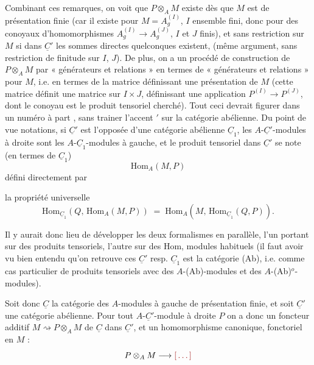 \documentclass[11pt,a4paper]{article}
\begin{document}
Combinant ces remarques, on voit que $P \otimes_A M$ existe  dès que $M$ est de présentation finie (car il existe pour $M = A_g^{(I)}$, $I$ ensemble fini, donc pour des conoyaux d'homomorphismes $A_g^{(I)} \to A_g^{(J)}$, $I$ et $J$ finis), et sans restriction sur $M$ si dans $\underline{C}'$ les sommes directes quelconques existent, (même argument, sans restriction de finitude sur $I$, $J$). De plus, on a un procédé de construction de $P \otimes_A M$ par « générateurs et relations » en termes de « générateurs et relations » pour $M$, i.e. en termes  de la matrice définissant une présentation  de $M$ (cette matrice définit une matrice sur $I \times J$, définissant une application $P^{(I)} \to P^{(J)}$, dont le conoyau est le produit tensoriel cherché). Tout ceci devrait figurer dans un numéro à part , sans trainer l'accent $'$ sur la catégorie abélienne. Du point de vue notations, si $\underline{C}'$ est  l'opposée  d'une catégorie abélienne $\underline{C}_1$,  les $A$-$\underline{C}'$-modules à droite sont les $A$-$\underline{C}_1$-modules à gauche, et le produit tensoriel dans $\underline{C}'$ se note (en termes de $\underline{C}_1$)
\[
  \mathrm{Hom}_A(M,P)
\]
défini directement par 

la propriété universelle
\[
  \mathrm{Hom}_{\underline{C}_1}(Q,\, \mathrm{Hom}_A(M,P)) \;=\; \mathrm{Hom}_A(M,\, \mathrm{Hom}_{\underline{C}_1}(Q,P)) .
\]

Il y aurait donc lieu de développer les deux formalismes en parallèle, l'un portant sur des produits tensoriels, l'autre sur des Hom,  modules habituels (il faut avoir vu bien entendu qu'on retrouve ces    $\underline{C}'$ resp. $\underline{C}_1$ est la catégorie (Ab), i.e. comme cas particulier de produits tensoriels avec des $A$-(Ab)-modules et des $A$-(Ab)$^{o}$-modules).

Soit donc $\underline{C}$ la catégorie des $A$-modules à gauche de présentation finie, et soit $\underline{C}'$ une catégorie abélienne. Pour tout $A$-$\underline{C}'$-module à droite $P$ on a donc un foncteur additif $M \rightsquigarrow P \otimes_A M$ de $\underline{C}$ dans $\underline{C}'$, et un homomorphisme canonique, fonctoriel en $M$ :
\[
  P \otimes_A M \longrightarrow \ill{}
\]
\end{document}
